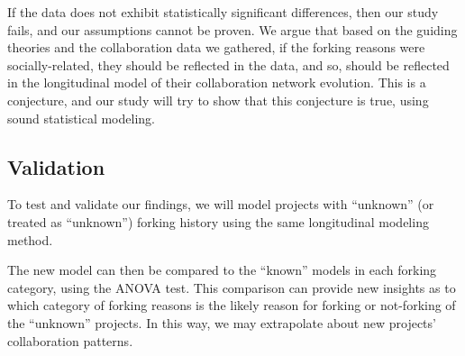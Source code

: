 \documentclass[11pt]{report}
\begin{document}
If the data does not exhibit statistically significant differences, then our study fails, and our assumptions cannot be proven. We argue that based on the guiding theories and the collaboration data we gathered, if the forking reasons were socially-related, they should be reflected in the data, and so, should be reflected in the longitudinal model of their collaboration network evolution.  This is a conjecture, and our study will try to show that this conjecture is true, using sound statistical modeling.

\subsection{Validation}

To test and validate our findings, we will model projects with ``unknown'' (or treated as ``unknown'') forking history using the same longitudinal modeling method. 

The new model can then be compared to the ``known'' models in each forking category, using the ANOVA test. This comparison can provide new insights as to which category of forking reasons is the likely reason for forking or not-forking of the ``unknown'' projects. In this way, we may extrapolate about new projects' collaboration patterns. 
\end{document}
